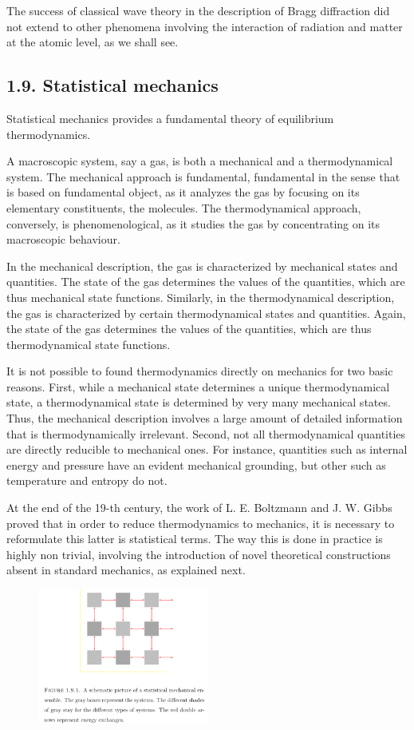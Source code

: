 \documentclass{article}
\begin{document}
The success of classical wave theory in the description of Bragg diffraction did not extend to other phenomena involving the interaction of radiation and matter at the atomic level, as we shall see.

\subsection*{1.9. Statistical mechanics}

Statistical mechanics provides a fundamental theory of equilibrium thermodynamics.

A macroscopic system, say a gas, is both a mechanical and a thermodynamical system. The mechanical approach is fundamental, fundamental in the sense that is based on fundamental object, as it analyzes the gas by focusing on its elementary constituents, the molecules. The thermodynamical approach, conversely, is phenomenological, as it studies the gas by concentrating on its macroscopic behaviour.

In the mechanical description, the gas is characterized by mechanical states and quantities. The state of the gas determines the values of the quantities, which are thus mechanical state functions. Similarly, in the thermodynamical description, the gas is characterized by certain thermodynamical states and quantities. Again, the state of the gas determines the values of the quantities, which are thus thermodynamical state functions.

It is not possible to found thermodynamics directly on mechanics for two basic reasons. First, while a mechanical state determines a unique thermodynamical state, a thermodynamical state is determined by very many mechanical states. Thus, the mechanical description involves a large amount of detailed information that is thermodynamically irrelevant. Second, not all thermodynamical quantities are directly reducible to mechanical ones. For instance, quantities such as internal energy and pressure have an evident mechanical grounding, but other such as temperature and entropy do not.

At the end of the 19-th century, the work of L. E. Boltzmann and J. W. Gibbs proved that in order to reduce thermodynamics to mechanics, it is necessary to reformulate this latter is statistical terms. The way this is done in practice is highly non trivial, involving the introduction of novel theoretical constructions absent in standard mechanics, as explained next.

\begin{figure}[h!]
    \centering
    \includegraphics[width=0.5\textwidth]{pictures_1/fig 1.9.1.png}
    \label{fig:1.9.1}
\end{figure}
\end{document}
